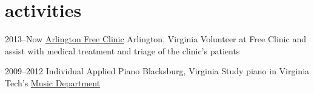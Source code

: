 \documentclass[]{friggeri-cv} %
\begin{document}

\section{activities}

\begin{entrylist}

\entry
{2013--Now}
{\href{http://www.arlingtonfreeclinic.org}{Arlington Free Clinic}}
{Arlington, Virginia}
{Volunteer at Free Clinic and assist with medical treatment and triage of the clinic's patients}

\entry
{2009--2012}
{Individual Applied Piano}
{Blacksburg, Virginia}
{Study piano in Virginia Tech's \href{http://www.music.vt.edu/}{Music Department}}
\end{entrylist}
\end{document}
